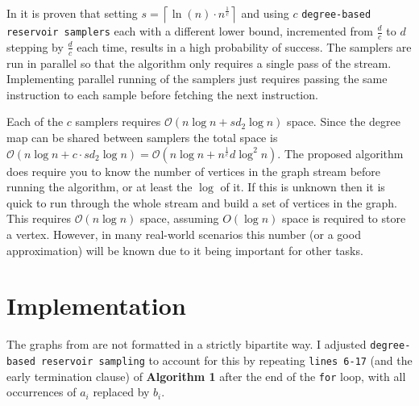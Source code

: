 \documentclass[11pt,twoside,a4paper]{report}
\begin{document}
\par In \cite{orig} it is proven that setting $s=\left\lceil\ln(n)\cdot n^{\frac1c}\right\rceil$ and using $c$ \texttt{degree-based reservoir samplers} each with a different lower bound, incremented from $\frac{d}c$ to $d$ stepping by $\frac{d}c$ each time, results in a high probability of success. The samplers are run in parallel so that the algorithm only requires a single pass of the stream. Implementing parallel running of the samplers just requires passing the same instruction to each sample before fetching the next instruction.

\par Each of the $c$ samplers requires $\mathcal{O}(n\log n+sd_2\log n)$ space. Since the degree map can be shared between samplers the total space is $\mathcal{O}(n\log n+c\cdot sd_2\log n)=\mathcal{O}(n\log n+n^{\frac1c}d\log^2n)$. The proposed algorithm does require you to know the number of vertices in the graph stream before running the algorithm, or at least the $\log$ of it. If this is unknown then it is quick to run through the whole stream and build a set of vertices in the graph. This requires $\mathcal{O}(n\log n)$ space, assuming $O(\log n)$ space is required to store a vertex. However, in many real-world scenarios this number (or a good approximation) will be known due to it being important for other tasks.

\section{Implementation}

\par The graphs from \cite{SNAP} are not formatted in a strictly bipartite way. I adjusted \texttt{degree-based reservoir sampling} to account for this by repeating \texttt{lines 6-17} (and the early termination clause) of \textbf{Algorithm 1} after the end of the \texttt{for} loop, with all occurrences of $a_i$ replaced by $b_i$.
\end{document}
